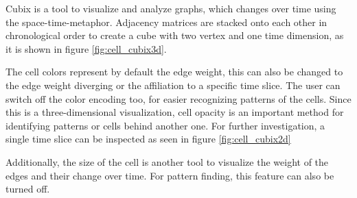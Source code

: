 Cubix is a tool to visualize and analyze graphs, which changes over time using the space-time-metaphor. Adjacency matrices are stacked onto each other in chronological order to create a cube with two vertex and one time dimension, as it is shown in figure \ref{fig:cell_cubix3d}.

The cell colors represent by default the edge weight, this can also be changed to the edge weight diverging or the affiliation to a specific time slice. The user can switch off the color encoding too, for easier recognizing patterns of the cells. Since this is a three-dimensional visualization, cell opacity is an important method for identifying patterns or cells behind another one. For further investigation, a single time slice can be inspected as seen in figure \ref{fig:cell_cubix2d}

Additionally, the size of the cell is another tool to visualize the weight of the edges and their change over time. For pattern finding, this feature can also be turned off.  \citep[877--886]{bach-cubix-2014}
